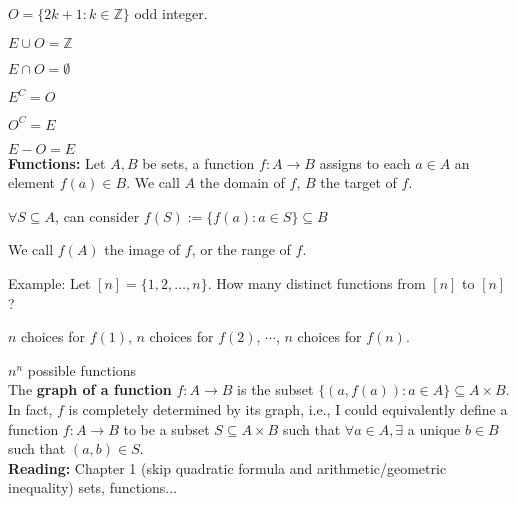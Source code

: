 \documentclass[a4paper, 11pt, twoside]{article}
\begin{document}
$O=\{2k+1: k\in \mathbb{Z}\}$ odd integer.

$E \cup O = \mathbb{Z}$

$E \cap O = \emptyset$

$E^C = O$

$O^C = E$

$E - O = E$\\

\textbf{Functions:} Let $A, B$ be sets, a function $f: A \rightarrow B$ assigns to each $a \in A$ an element $f(a) \in B$. We call $A$ the domain of $f$, $B$ the target of $f$.

$\forall S \subseteq A$, can consider $f(S):= \{f(a): a \in S\} \subseteq B$

We call $f(A)$ the image of $f$, or the range of $f$.

Example: Let $[n] = \{1, 2, \dots , n\}$. How many distinct functions from $[n]$ to $[n]$?

$n$ choices for $f(1)$, $n$ choices for $f(2)$, $\cdots$, $n$ choices for $f(n)$.

$n^n$ possible functions\\

The \textbf{graph of a function} $f:A\rightarrow B$ is the subset $\{(a, f(a)):a\in A\}\subseteq A\times B$. In fact, $f$ is completely determined by its graph, i.e., I could equivalently define a function $f: A\rightarrow B$ to be a subset $S\subseteq A \times B$ such that $\forall a \in A, \exists$ a unique $b\in B$ such that $(a, b) \in S$.\\

\textbf{Reading:} Chapter 1 (skip quadratic formula and arithmetic/geometric inequality) sets, functions...
\end{document}
